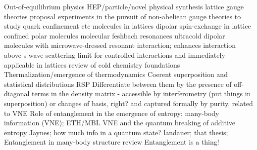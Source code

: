 Out-of-equilibrium physics
		\cite{Eisert15}%
	HEP/particle/novel physical synthesis
		\cite{Keilmann11}%
		lattice gauge theories
			proposal
				\cite{Zohar16}%
			experiments
				\cite{Schweizer19}%
		in the pursuit of non-abeliean gauge theories to study quark confinement etc
			\cite{Tagliacozzo13}%
molecules in lattices
		\cite{Yan13} dipolar spin-exchange in lattice confined polar molecules
		\cite{Yang19} molecular feshbach resonances
		\cite{Yan20} ultracold dipolar molecules with microwave-dressed resonant interaction; enhances interaction above s-wave scattering limit for controlled interactions and immediately applicable in lattices
		\cite{Balakrishnan16} review of cold chemistry 
		\cite{Yelin06, micheli06} %
foundations
	Thermalization/emergence of thermodynamics
		\cite{Anderson58}%
		\cite{Dalessio16}%
		\cite{Goold16}%
		\cite{Srednicki94}%
		\cite{Clos16}%
		\cite{Kaufman16}%
		Coerent superposition and statistical distributions RSP
			Differentiate between them by the presence of off-diagonal terms in the density matrix - accessible by interferometry (put things in superposition) or changes of basis, right? and captured formally by purity, related to VNE 
	Role of entanglement in the emergence of entropy; many-body information (VNE); ETH/MBL
		\cite{Kaufman16}%
		\cite{Nandkishore15}%
			VNE and the quantum breaking of additive entropy
		\cite{Chiu18}%
Jaynes; how much info in a quantum state? landauer; that thesis; 
Entanglement in many-body structure
	\cite{Amico08} review 
	Entanglement is a thing!%
